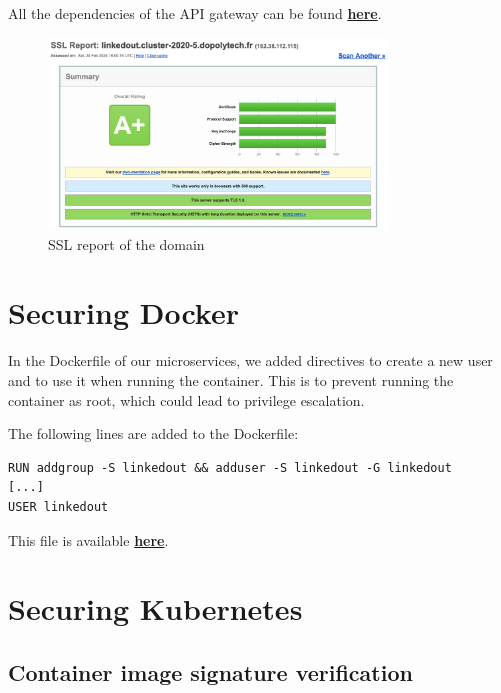 \documentclass[12pt,x11names]{article}
\begin{document}
All the dependencies of the API gateway can be found \href{https://github.com/thomas-mauran/LinkedOut/blob/main/backend/api_gateway/build.gradle.kts}{\textbf{here}}.

\begin{figure}[H]
  \centering
  \includegraphics[width=0.8\textwidth]{imgs/ssl_report.png}
  \caption{SSL report of the domain}
\end{figure}

\section{Securing Docker}

In the Dockerfile of our microservices, we added directives to create a new user and to
use it when running the container. This is to prevent running the container as root, which
could lead to privilege escalation.

\medskip
The following lines are added to the Dockerfile:

\begin{lstlisting}
RUN addgroup -S linkedout && adduser -S linkedout -G linkedout
[...]
USER linkedout
\end{lstlisting}

This file is available \href{https://github.com/thomas-mauran/LinkedOut/blob/main/backend/Dockerfile}{\textbf{here}}.

\section{Securing Kubernetes}

\subsection{Container image signature verification}
\end{document}
